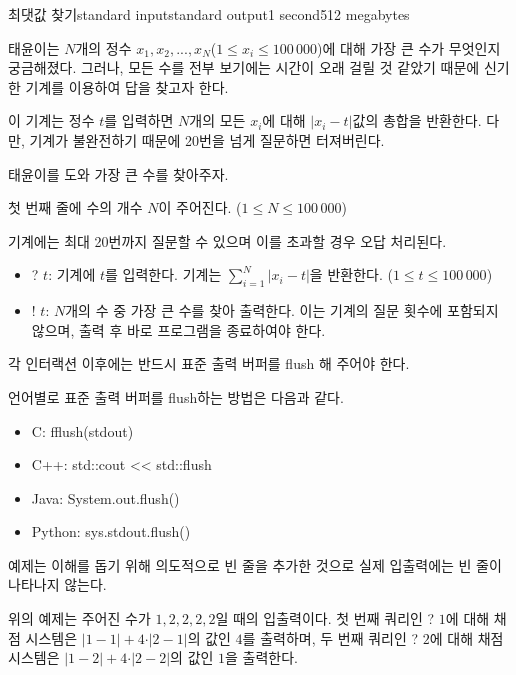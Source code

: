 \begin{problem}{최댓값 찾기}{standard input}{standard output}{1 second}{512 megabytes}

태윤이는 $N$개의 정수 $x_1, x_2,...,x_N $($1 \leq x_i \leq 100\,000$)에 대해 가장 큰 수가 무엇인지 궁금해졌다. 그러나, 모든 수를 전부 보기에는 시간이 오래 걸릴 것 같았기 때문에 신기한 기계를 이용하여 답을 찾고자 한다.

이 기계는 정수 $t$를 입력하면 $N$개의 모든 $x_i$에 대해 $\vert x_i - t \vert$값의 총합을 반환한다. 다만, 기계가 불완전하기 때문에 20번을 넘게 질문하면 터져버린다.

태윤이를 도와 가장 큰 수를 찾아주자.

\InputFile
첫 번째 줄에 수의 개수 $N$이 주어진다. ($1 \leq N \leq 100\,000$)

\Interaction
기계에는 최대 20번까지 질문할 수 있으며 이를 초과할 경우 오답 처리된다.

\begin{itemize}
\item ? $t$: 기계에 $t$를 입력한다. 기계는 $\sum_{i=1}^{N}{\vert x_i-t \vert}$을 반환한다. ($1 \leq t \leq 100\,000$)

\item ! $t$: $N$개의 수 중 가장 큰 수를 찾아 출력한다. 이는 기계의 질문 횟수에 포함되지 않으며, 출력 후 바로 프로그램을 종료하여야 한다.
\end{itemize}

각 인터랙션 이후에는 반드시 표준 출력 버퍼를 flush 해 주어야 한다.

언어별로 표준 출력 버퍼를 flush하는 방법은 다음과 같다.

\begin{itemize}
    \item C: fflush(stdout)

    \item C++: std::cout << std::flush

    \item Java: System.out.flush()

    \item Python: sys.stdout.flush()
\end{itemize}


\Example

\begin{example}


\end{example}

\Note
예제는 이해를 돕기 위해 의도적으로 빈 줄을 추가한 것으로 실제 입출력에는 빈 줄이 나타나지 않는다.

위의 예제는 주어진 수가 $1, 2, 2, 2, 2$일 때의 입출력이다. 첫 번째 쿼리인 ? $1$에 대해 채점 시스템은 ${\vert 1-1 \vert + 4 \cdot \vert 2-1 \vert}$의 값인 $4$를 출력하며, 두 번째 쿼리인 ? $2$에 대해 채점 시스템은 ${\vert 1-2 \vert + 4 \cdot \vert 2-2 \vert}$의 값인 $1$을 출력한다.

\end{problem}